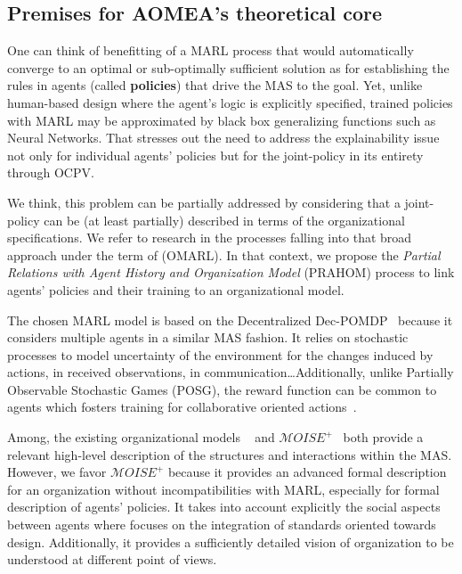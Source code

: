 \documentclass[runningheads]{llncs}
\begin{document}
\subsection{Premises for AOMEA's theoretical core}

One can think of benefitting of a MARL process that would automatically converge to an optimal or sub-optimally sufficient solution as for establishing the rules in agents (called \textbf{policies}) that drive the MAS to the goal. Yet, unlike human-based design where the agent's logic is explicitly specified, trained policies with MARL may be approximated by black box generalizing functions such as Neural Networks. That stresses out the need to address the explainability issue not only for individual agents' policies but for the joint-policy in its entirety through OCPV.

We think, this problem can be partially addressed by considering that a joint-policy can be (at least partially) described in terms of the organizational specifications.
We refer to research in the processes falling into that broad approach under the term of  (OMARL).
In that context, we propose the \emph{Partial Relations with Agent History and Organization Model} (PRAHOM) process to link agents' policies and their training to an organizational model.

The chosen MARL model is based on the Decentralized Dec-POMDP~\cite{Oliehoek2016} because it considers multiple agents in a similar MAS fashion. It relies on stochastic processes to model uncertainty of the environment for the changes induced by actions, in received observations, in communication\dots Additionally, unlike Partially Observable Stochastic Games (POSG), the reward function can be common to agents which fosters training for collaborative oriented actions~\cite{Beynier2013}.

Among, the existing organizational models ~\cite{Ferber2004} and \allowbreak $\mathcal{M}OISE^+$~\cite{Hubner2002} both provide a relevant high-level description of the structures and interactions within the MAS. However, we favor $\mathcal{M}OISE^+$ because it provides an advanced formal description for an organization without incompatibilities with MARL, especially for formal description of agents' policies. It takes into account explicitly the social aspects between agents where  focuses on the integration of standards oriented towards design. Additionally, it provides a sufficiently detailed vision of organization to be understood at different point of views.
\end{document}
